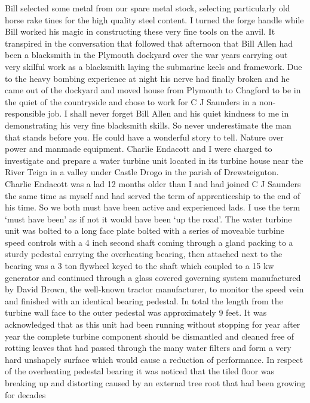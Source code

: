 Bill selected some metal from our spare metal stock, selecting particularly old
horse rake tines for the high quality steel content.  I turned the forge handle
while Bill worked his magic in constructing these very fine tools on the anvil.
It transpired in the conversation that followed that afternoon that Bill Allen
had been a blacksmith in the Plymouth dockyard over the war years carrying out
very skilful work as a blacksmith laying the submarine keels and framework. Due
to the heavy bombing experience at night his nerve had finally broken and he
came out of the dockyard and moved house from Plymouth to Chagford to be in the
quiet of the countryside and chose to work for C J Saunders in a
non-responsible job.  I shall never forget Bill Allen and his quiet kindness to
me in demonstrating his very fine blacksmith skills.  So never underestimate
the man that stands before you.  He could have a wonderful story to tell.
Nature over power and manmade equipment.  Charlie Endacott and I were charged
to investigate and prepare a water turbine unit located in its turbine house
near the River Teign in a valley under Castle Drogo in the parish of
Drewsteignton.  Charlie Endacott was a lad 12 months older than I and had
joined C J Saunders the same time as myself and had served the term of
apprenticeship to the end of his time.  So we both must have been active and
experienced lads.  I use the term ‘must have been' as if not it would have
been ‘up the road'. The water turbine unit was bolted to a long face plate
bolted with a series of moveable turbine speed controls with a 4 inch second
shaft coming through a gland packing to a sturdy pedestal carrying the
overheating bearing, then attached next to the bearing was a 3 ton flywheel
keyed to the shaft which coupled to a 15 kw generator and continued through a
glass covered governing system manufactured by David Brown, the well-known
tractor manufacturer, to monitor the speed vein            and finished with an
identical bearing pedestal.  In total the length from the turbine wall face to
the outer pedestal was approximately 9 feet.  It was acknowledged that as this
unit had been running without stopping for year after year the complete turbine
component should be dismantled and cleaned free of rotting leaves that had
passed through the many water filters and form a very hard unshapely surface
which would cause a reduction of performance.  In respect of the overheating
pedestal bearing it was noticed that the tiled floor was breaking up and
distorting caused by an external tree root that had been growing for decades
